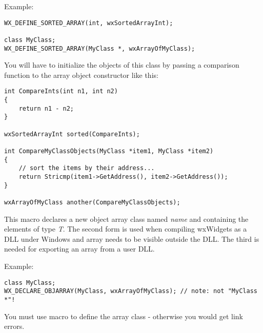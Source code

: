 Example:

\begin{verbatim}
WX_DEFINE_SORTED_ARRAY(int, wxSortedArrayInt);

class MyClass;
WX_DEFINE_SORTED_ARRAY(MyClass *, wxArrayOfMyClass);
\end{verbatim}

You will have to initialize the objects of this class by passing a comparison
function to the array object constructor like this:

\begin{verbatim}
int CompareInts(int n1, int n2)
{
    return n1 - n2;
}

wxSortedArrayInt sorted(CompareInts);

int CompareMyClassObjects(MyClass *item1, MyClass *item2)
{
    // sort the items by their address...
    return Stricmp(item1->GetAddress(), item2->GetAddress());
}

wxArrayOfMyClass another(CompareMyClassObjects);
\end{verbatim}

\label{wxdeclareobjarray}




This macro declares a new object array class named {\it name} and containing
the elements of type {\it T}. The second form is used when compiling wxWidgets as
a DLL under Windows and array needs to be visible outside the DLL.  The third is
needed for exporting an array from a user DLL.

Example:

\begin{verbatim}
class MyClass;
WX_DECLARE_OBJARRAY(MyClass, wxArrayOfMyClass); // note: not "MyClass *"!
\end{verbatim}

You must use  macro to define
the array class - otherwise you would get link errors.

\label{wxdefineobjarray}



